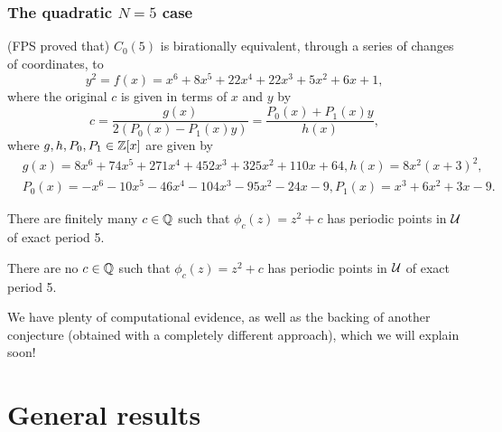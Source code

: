 \documentclass[aspectratio=1610]{beamer}
\begin{document}
\begin{frame}
  \frametitle{The quadratic $N = 5$ case}

  \pause

  (FPS proved that) $C_0(5)$ is birationally equivalent, through a
  series of changes of coordinates, to
  \begin{equation}
    \label{eq:c0(5)}
    y^2 = f(x) = x^6 + 8x^5 + 22x^4 + 22x^3 + 5x^2 + 6x + 1,
  \end{equation}
  where the original $c$ is given in terms of $x$ and $y$ by
  \begin{equation}
    \label{eq:c-in-xy}
    c = \frac{g(x)}{2(P_0(x) - P_1(x) y)}
    = \frac{P_0(x) + P_1(x) y}{h(x)},
  \end{equation}
  where $g, h, P_0, P_1 \in \mathbb{Z}[x]$ are given by
  \begin{equation}
    \label{eq:poly-defs}
    \begin{aligned}
      & g(x) = 8x^6 + 74x^5 + 271x^4 + 452x^3 + 325x^2 + 110x + 64,
      h(x) = 8x^2(x+3)^2,\\
      & P_0(x) = - x^6 - 10x^5 - 46x^4 - 104x^3 - 95x^2 - 24x - 9,
      P_1(x) = x^3 + 6x^2 + 3x - 9.
    \end{aligned}
  \end{equation}

  \pause

  \begin{htheorem}
    There are finitely many $c \in \mathbb{Q}$ such that $\phi_c(z) = z^2 + c$
    has periodic points in $\mathcal{U}$ of exact period 5.
  \end{htheorem}

  \pause

  \begin{hconjecture}
    There are no $c \in \mathbb{Q}$ such that $\phi_c(z) = z^2 + c$ has
    periodic points in $\mathcal{U}$ of exact period 5.
  \end{hconjecture}

  We have plenty of computational evidence, as well as the backing of
  another conjecture (obtained with a completely different approach),
  which we will explain soon!
\end{frame}

\section{General results}

\newcommand{\nd}{\frac{N}{(N, d)}}
\end{document}
